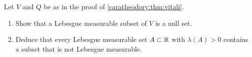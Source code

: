 \begin{notechapter}
\begin{exercise}\label{caratheodory:exr:8}
Let $V$ and $Q$ be as in the proof of \cref{caratheodory:thm:vitali}.
\begin{enumerate}[nosep]
  \item Show that a Lebesgue measurable subset of $V$ is a null set.
  \item Deduce that every Lebesgue measurable set $A\subset\mathbb{R}$ with
        $\lambda(A) > 0$ contains a subset that is not Lebesgue
        measurable.
\end{enumerate}
\end{exercise}
\end{notechapter}
